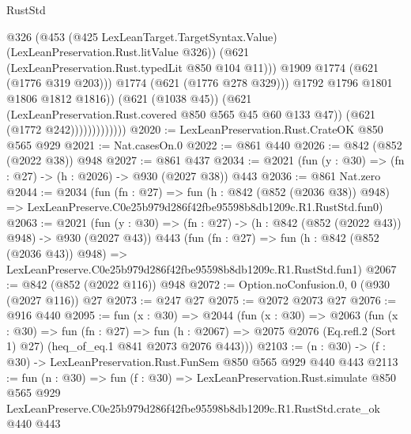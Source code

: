 \begin{lexlean}{RustStd}
\begin{coremodule}
                                    @326
                                    (@453
                                      (@425 LexLeanTarget.TargetSyntax.Value)
                                      (LexLeanPreservation.Rust.litValue @326))
                                    (@621 (LexLeanPreservation.Rust.typedLit @850 @104 @11)))
                                  @1909
                                  @1774
                                  (@621 (@1776 @319 @203)))
                                @1774
                                (@621 (@1776 @278 @329)))
                              @1792
                              @1796
                              @1801
                              @1806
                              @1812
                              @1816))
                          (@621 (@1038 @45))
                          (@621 (LexLeanPreservation.Rust.covered @850 @565 @45 @60 @133 @47))
                          (@621 (@1772 @242)))))))))))))
@2020 := LexLeanPreservation.Rust.CrateOK @850 @565 @929
@2021 := Nat.casesOn.{0}
@2022 := @861 @440
@2026 := @842 (@852 (@2022 @38)) @948
@2027 := @861 @437
@2034 := @2021 (fun (y : @30) => (fn : @27) -> (h : @2026) -> @930 (@2027 @38)) @443
@2036 := @861 Nat.zero
@2044 := @2034
    (fun (fn : @27) =>
    fun (h : @842 (@852 (@2036 @38)) @948) =>
    LexLeanPreserve.C0e25b979d286f42fbe95598b8db1209c.R1.RustStd.fun0)
@2063 := @2021
    (fun (y : @30) => (fn : @27) -> (h : @842 (@852 (@2022 @43)) @948) -> @930 (@2027 @43))
    @443
    (fun (fn : @27) =>
    fun (h : @842 (@852 (@2036 @43)) @948) =>
    LexLeanPreserve.C0e25b979d286f42fbe95598b8db1209c.R1.RustStd.fun1)
@2067 := @842 (@852 (@2022 @116)) @948
@2072 := Option.noConfusion.{0, 0} (@930 (@2027 @116)) @27
@2073 := @247 @27
@2075 := @2072 @2073 @27
@2076 := @916 @440
@2095 := fun (x : @30) =>
  @2044
    (fun (x : @30) =>
    @2063
      (fun (x : @30) =>
      fun (fn : @27) =>
      fun (h : @2067) =>
      @2075 @2076 (Eq.refl.{2} (Sort 1) @27) (heq_of_eq.{1} @841 @2073 @2076 @443)))
@2103 := (n : @30) -> (f : @30) -> LexLeanPreservation.Rust.FunSem @850 @565 @929 @440 @443
@2113 := fun (n : @30) =>
  fun (f : @30) =>
  LexLeanPreservation.Rust.simulate
    @850
    @565
    @929
    LexLeanPreserve.C0e25b979d286f42fbe95598b8db1209c.R1.RustStd.crate_ok
    @440
    @443
\end{coremodule}
\end{lexlean}
